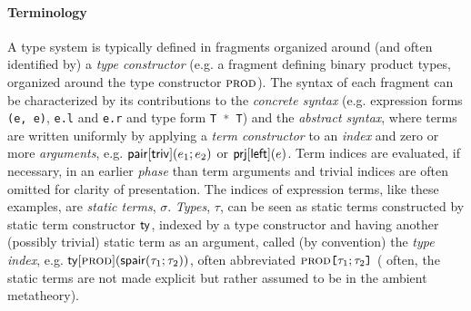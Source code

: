 \documentclass[9pt,preprint]{sigplanconf}
\newcommand{\FF}[1]{{\sf #1}}
\newcommand{\lstinlinep}[1]{\lstinline[language=Python,basicstyle=\ttfamily\small]{#1}}
\begin{document}
\paragraph{Terminology}
A type system is typically defined in fragments organized around (and often identified by) a \emph{type constructor} (e.g. a fragment defining binary product types, organized around the type constructor $\textsc{prod}$). The syntax of each fragment can be characterized by its contributions to the \emph{concrete syntax} (e.g. expression forms \lstinlinep{(e, e)}, \lstinlinep{e.l} and \lstinlinep{e.r} and type form \lstinlinep{T * T}) and the \emph{abstract syntax}, where terms are written uniformly by applying a \emph{term constructor} to an \emph{index} and zero or more \emph{arguments}, e.g. $\FF{pair}[\FF{triv}](e_1; e_2)$ or $\FF{prj}[\FF{left}](e)$. Term indices are evaluated, if necessary, in an earlier \emph{phase} than term arguments and trivial indices are often omitted for clarity of presentation. The indices of expression terms,  like these examples,  are \emph{static terms}, $\sigma$. \emph{Types}, $\tau$, can be seen as static terms constructed by static term constructor $\FF{ty}$, indexed by a type constructor and having another (possibly trivial) static term as an argument, called (by convention) the \emph{type index}, e.g. $\FF{ty}[\fvar{prod}](\FF{spair}(\tau_1; \tau_2))$, often  abbreviated $\textsc{prod}\texttt{[}\tau_1; \tau_2\texttt{]}$ (%
 often, the static terms are not made explicit but rather assumed to be in the ambient metatheory).%

\end{document}
